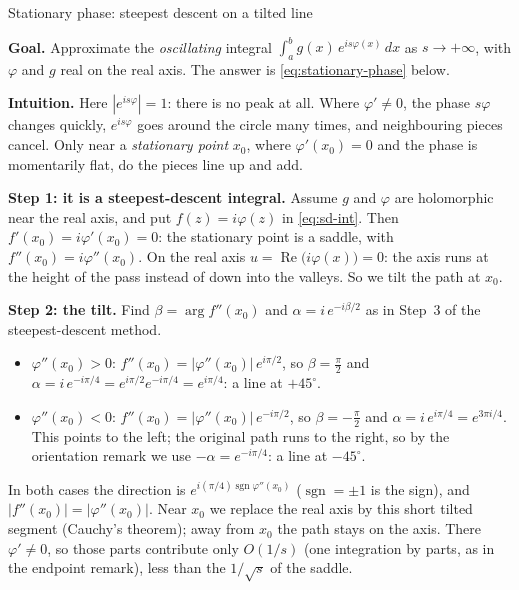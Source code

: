 \documentclass[11pt]{beamer}
\begin{document}
\begin{frame}[allowframebreaks=1.00]{Stationary phase: steepest descent on a tilted line}
\footnotesize

\textbf{Goal.} Approximate the \emph{oscillating} integral \(\int_a^b g(x)\,e^{is\varphi(x)}\,dx\) as \(s\to+\infty\), with \(\varphi\)
and \(g\) real on the real axis. The answer is \eqref{eq:stationary-phase} below.

\textbf{Intuition.} Here \(|e^{is\varphi}|=1\): there is no peak at all. Where \(\varphi'\ne0\), the phase \(s\varphi\)
changes quickly, \(e^{is\varphi}\) goes around the circle many times, and neighbouring pieces cancel.
Only near a \emph{stationary point} \(x_0\), where \(\varphi'(x_0)=0\) and the phase is momentarily flat, do
the pieces line up and add.

\textbf{Step 1: it is a steepest-descent integral.} Assume \(g\) and \(\varphi\) are holomorphic near the real
axis, and put \(f(z)=i\varphi(z)\) in \eqref{eq:sd-int}. Then \(f'(x_0)=i\varphi'(x_0)=0\): the stationary point is a
saddle, with \(f''(x_0)=i\varphi''(x_0)\). On the real axis \(u=\operatorname{Re}\bigl(i\varphi(x)\bigr)=0\): the axis
runs at the height of the pass instead of down into the valleys. So we tilt the path at \(x_0\).


\textbf{Step 2: the tilt.} Find \(\beta=\arg f''(x_0)\) and \(\alpha=i\,e^{-i\beta/2}\) as in Step~3 of the steepest-descent method.
\begin{itemize}
  \item \(\varphi''(x_0)>0\): \(f''(x_0)=|\varphi''(x_0)|\,e^{i\pi/2}\), so \(\beta=\frac\pi2\) and
        \(\alpha=i\,e^{-i\pi/4}=e^{i\pi/2}e^{-i\pi/4}=e^{i\pi/4}\): a line at \(+45^\circ\).
  \item \(\varphi''(x_0)<0\): \(f''(x_0)=|\varphi''(x_0)|\,e^{-i\pi/2}\), so \(\beta=-\frac\pi2\) and \(\alpha=i\,e^{i\pi/4}=e^{3\pi i/4}\).
        This points to the left; the original path runs to the right, so by the orientation remark
        we use \(-\alpha=e^{-i\pi/4}\): a line at \(-45^\circ\).
\end{itemize}
In both cases the direction is \(e^{i(\pi/4)\operatorname{sgn}\varphi''(x_0)}\) (\(\operatorname{sgn}=\pm1\) is the sign), and
\(|f''(x_0)|=|\varphi''(x_0)|\). Near \(x_0\) we replace the real axis by this short
tilted segment (Cauchy's theorem); away from \(x_0\) the path stays on the axis. There \(\varphi'\ne0\), so those
parts contribute only \(O(1/s)\) (one integration by parts, as in the endpoint remark), less than the
\(1/\sqrt s\) of the saddle.


\end{frame}
\end{document}
